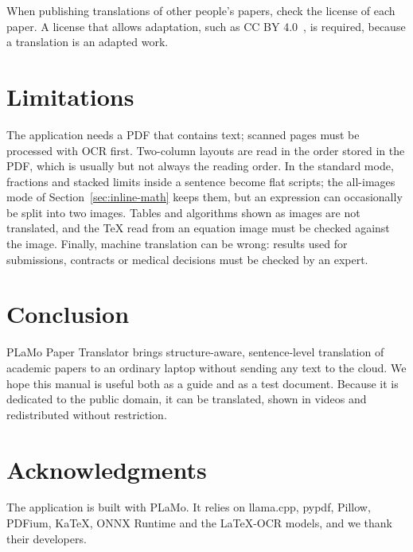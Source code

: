 \documentclass[11pt]{article}
\begin{document}
When publishing translations of other people's papers, check the license of each paper. A license that allows adaptation, such as CC BY 4.0~\cite{ccby}, is required, because a translation is an adapted work.

\section{Limitations}
\label{sec:limitations}
The application needs a PDF that contains text; scanned pages must be processed with OCR first. Two-column layouts are read in the order stored in the PDF, which is usually but not always the reading order. In the standard mode, fractions and stacked limits inside a sentence become flat scripts; the all-images mode of Section~\ref{sec:inline-math} keeps them, but an expression can occasionally be split into two images. Tables and algorithms shown as images are not translated, and the \TeX{} read from an equation image must be checked against the image. Finally, machine translation can be wrong: results used for submissions, contracts or medical decisions must be checked by an expert.

\section{Conclusion}
\label{sec:conclusion}
PLaMo Paper Translator brings structure-aware, sentence-level translation of academic papers to an ordinary laptop without sending any text to the cloud. We hope this manual is useful both as a guide and as a test document. Because it is dedicated to the public domain, it can be translated, shown in videos and redistributed without restriction.

\section*{Acknowledgments}
The application is built with PLaMo. It relies on llama.cpp, pypdf, Pillow, PDFium, KaTeX, ONNX Runtime and the LaTeX-OCR models, and we thank their developers.
\end{document}

